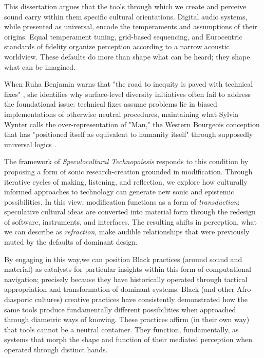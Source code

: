 This dissertation argues that the tools through which we create and perceive sound carry within them specific cultural orientations. Digital audio systems, while presented as universal, encode the temperaments and assumptions of their origins. Equal temperament tuning, grid-based sequencing, and Eurocentric standards of fidelity organize perception according to a narrow acoustic worldview. These defaults do more than shape what can be heard; they shape what can be imagined.

When Ruha Benjamin warns that "the road to inequity is paved with technical fixes" \parencite[p. 13]{Benjamin_2019a}, she identifies why surface-level diversity initiatives often fail to address the foundational issue: technical fixes assume problems lie in biased implementations of otherwise neutral procedures, maintaining what Sylvia Wynter calls the over-representation of "Man," the Western Bourgeois conception that has "positioned itself as equivalent to humanity itself" through supposedly universal logics \parencite{Wynter_2003}. 

The framework of \textit{Speculocultural Technopoiesis} responds to this condition by proposing a form of sonic research-creation grounded in modification. Through iterative cycles of making, listening, and reflection, we explore how culturally informed approaches to technology can generate new sonic and epistemic possibilities. In this view, modification functions as a form of \textit{transduction}: speculative cultural ideas are converted into material form through the redesign of software, instruments, and interfaces. The resulting shifts in perception, what we can describe as \textit{refraction}, make audible relationships that were previously muted by the defaults of dominant design.

By engaging in this way,we can position Black practices (around sound and material) as catalysts for particular insights within this form of  computational navigation; precisely because they have historically operated through tactical appropriation and transformation of dominant systems. Black (and other Afro-diasporic cultures) creative practices have consistently demonstrated how the same tools produce fundamentally different possibilities when approached through diametric ways of knowing. These practices affirm (in their own way) that tools cannot be a neutral container. They function, fundamentally, as systems that morph the shape and function of their mediated perception when operated through distinct hands.

